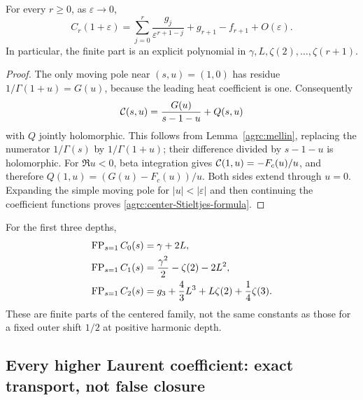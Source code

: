 \begin{theorem}
\label{agrc:center-Stieltjes}
For every $r\geq0$, as $\varepsilon\to0$,
\begin{equation}\label{agrc:center-Stieltjes-formula}
 \boxed{\displaystyle
 C_r(1+\varepsilon)=
 \sum_{j=0}^r\frac{g_j}{\varepsilon^{r+1-j}}
                +g_{r+1}-f_{r+1}+O(\varepsilon).}
\end{equation}
In particular, the finite part is an explicit polynomial in
$\gamma,L,\zeta(2),\ldots,\zeta(r+1)$.
\end{theorem}
\begin{proof}
The only moving pole near $(s,u)=(1,0)$ has residue
$1/\Gamma(1+u)=G(u)$, because the leading heat coefficient is one.
Consequently
\[
 \mathcal C(s,u)=\frac{G(u)}{s-1-u}+Q(s,u)
\]
with $Q$ jointly holomorphic. This follows from
Lemma~\ref{agrc:mellin}, replacing the numerator $1/\Gamma(s)$ by
$1/\Gamma(1+u)$; their difference divided by $s-1-u$ is holomorphic.
For $\Re u<0$, beta integration gives
$\mathcal C(1,u)=-F_c(u)/u$, and therefore
$Q(1,u)=(G(u)-F_c(u))/u$. Both sides extend through $u=0$.
Expanding the simple moving pole for $|u|<|\varepsilon|$ and then
continuing the coefficient functions proves
\eqref{agrc:center-Stieltjes-formula}.
\end{proof}

For the first three depths,
\begin{align}
 \operatorname{FP}_{s=1}C_0(s)&=\gamma+2L,\notag\\
 \operatorname{FP}_{s=1}C_1(s)&=\frac{\gamma^2}{2}-\zeta(2)-2L^2,\notag\\
 \operatorname{FP}_{s=1}C_2(s)&=g_3+\frac43L^3+L\zeta(2)+\frac14\zeta(3).
 \label{agrc:center-FP-examples}
\end{align}
These are finite parts of the centered family, not the same constants
as those for a fixed outer shift $1/2$ at positive harmonic depth.

\subsection{Every higher Laurent coefficient: exact transport, not false closure}

